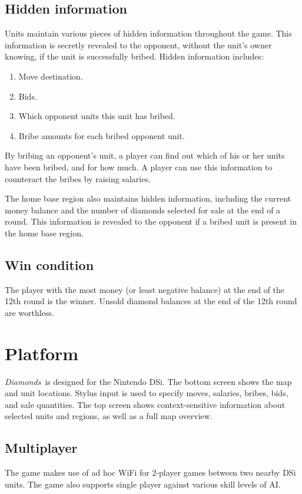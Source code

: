 \documentclass[12pt]{article}
\newcommand{\gtitle}{{\it Diamonds}}
\begin{document}
\subsection{Hidden information}
Units maintain various pieces of hidden information throughout the game.  This information is secretly revealed to the opponent, without the unit's owner knowing, if the unit is successfully bribed.  Hidden information includes:
\begin{enumerate}
\item Move destination.
\item Bids.
\item Which opponent units this unit has bribed.
\item Bribe amounts for each bribed opponent unit.
\end{enumerate}
By bribing an opponent's unit, a player can find out which of his or her units have been bribed, and for how much.  A player can use this information to counteract the bribes by raising salaries.

The home base region also maintains hidden information, including the current money balance and the number of diamonds selected for sale at the end of a round.  This information is revealed to the opponent if a bribed unit is present in the home base region.



\subsection{Win condition}
The player with the most money (or least negative balance) at the end of the 12th round is the winner.  Unsold diamond balances at the end of the 12th round are worthless.


\section{Platform}

\gtitle\ is designed for the Nintendo DSi.  The bottom screen shows the map and unit locations.  Stylus input is used to specify moves, salaries, bribes, bids, and sale quantities.  The top screen shows context-sensitive information about selected units and regions, as well as a full map overview.

\subsection{Multiplayer}

The game makes use of ad hoc WiFi for 2-player games between two nearby DSi units.  The game also supports single player against various skill levels of AI.
\end{document}
